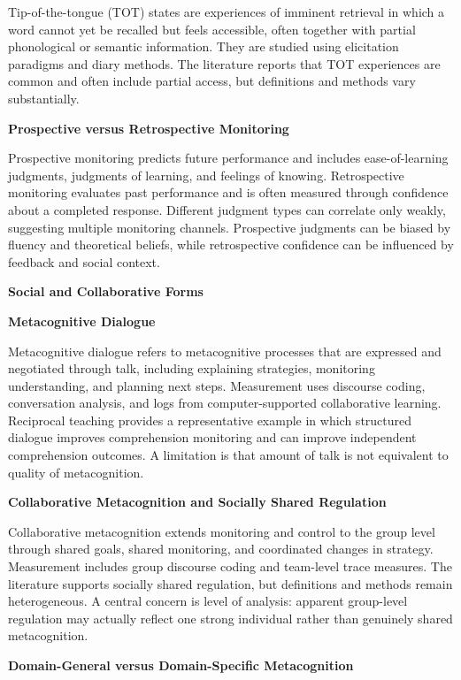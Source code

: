 \documentclass{book}
\providecommand{\ProjectDeepHeading}[2]{%
    \par\medskip\noindent\textbf{#2}\par\smallskip
}
\begin{document}
   Tip-of-the-tongue (TOT) states are experiences of imminent retrieval in which a word cannot yet be recalled but feels accessible, often together with partial phonological or semantic information. They are studied using elicitation paradigms and diary methods. The literature reports that TOT experiences are common and often include partial access, but definitions and methods vary substantially.

   \ProjectDeepHeading{6}{Prospective versus Retrospective Monitoring}

   Prospective monitoring predicts future performance and includes ease-of-learning judgments, judgments of learning, and feelings of knowing. Retrospective monitoring evaluates past performance and is often measured through confidence about a completed response. Different judgment types can correlate only weakly, suggesting multiple monitoring channels. Prospective judgments can be biased by fluency and theoretical beliefs, while retrospective confidence can be influenced by feedback and social context.

   \ProjectDeepHeading{5}{Social and Collaborative Forms}

   \ProjectDeepHeading{6}{Metacognitive Dialogue}

   Metacognitive dialogue refers to metacognitive processes that are expressed and negotiated through talk, including explaining strategies, monitoring understanding, and planning next steps. Measurement uses discourse coding, conversation analysis, and logs from computer-supported collaborative learning. Reciprocal teaching provides a representative example in which structured dialogue improves comprehension monitoring and can improve independent comprehension outcomes. A limitation is that amount of talk is not equivalent to quality of metacognition.

   \ProjectDeepHeading{6}{Collaborative Metacognition and Socially Shared Regulation}

   Collaborative metacognition extends monitoring and control to the group level through shared goals, shared monitoring, and coordinated changes in strategy. Measurement includes group discourse coding and team-level trace measures. The literature supports socially shared regulation, but definitions and methods remain heterogeneous. A central concern is level of analysis: apparent group-level regulation may actually reflect one strong individual rather than genuinely shared metacognition.

   \ProjectDeepHeading{5}{Domain-General versus Domain-Specific Metacognition}
\end{document}

